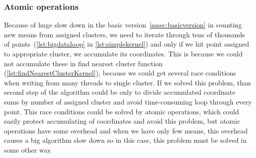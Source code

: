 \subsubsection{Atomic operations}
Because of huge slow down in the basic version~\autoref{sssec:basicversion} in counting new means from assigned clusters, we need to iterate through tens of thousands of points~(\autoref{lst:bigdataloop} in \autoref{lst:simplekernel})  and only if we hit point assigned to appropriate cluster, we accumulate its coordinates. This is because we could not accumulate these in find nearest cluster function (\autoref{lst:findNearestClusterKernel}), because we could get several race conditions when writing from many threads to single cluster. If we solved this problem, than second step of the algorithm could be only to divide accumulated coordinate sums by number of assigned cluster and avoid time-consuming loop through every point. This race conditions could be solved by atomic operations, which could easily protect accumulating of coordinates and avoid this problem, but atomic operations have some overhead and when we have only few means, this overhead causes a big algorithm slow down so in this case, this problem must be solved in some other way.

